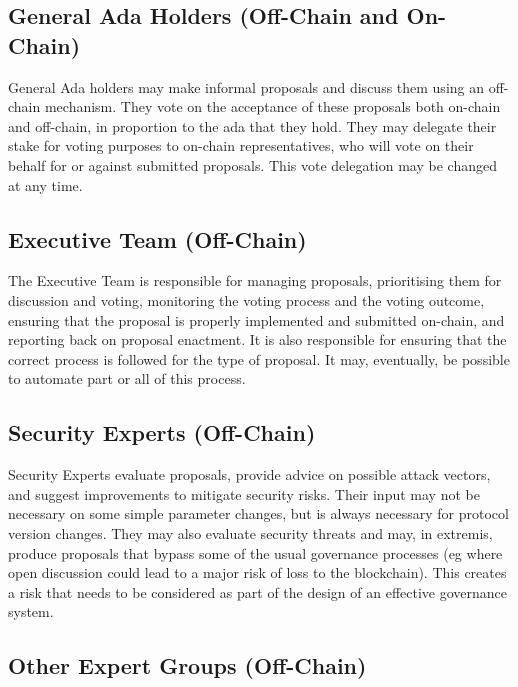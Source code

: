 \subsection{General Ada Holders (Off-Chain and On-Chain)}

General Ada holders may make informal proposals and discuss them using an off-chain mechanism.  They vote on the acceptance of these proposals
both on-chain and off-chain, in proportion to the ada that they hold.  They may delegate their stake for voting purposes to on-chain representatives,
who will vote on their behalf for or against submitted proposals.  This vote delegation may be changed at any time.

\subsection{Executive Team (Off-Chain)}

The Executive Team is responsible for managing proposals, prioritising them for discussion and voting, monitoring the voting process and the
voting outcome, ensuring that the proposal is properly implemented and submitted on-chain, and reporting back on proposal enactment.
It is also responsible for ensuring that the correct process is followed for the type of proposal.  It may, eventually, be possible to automate part or all of this process.

\subsection{Security Experts (Off-Chain)}

Security Experts evaluate proposals, provide advice on possible attack vectors, and suggest improvements to mitigate security risks.
Their input may not be necessary on some simple parameter changes, but is always necessary for protocol version changes.
They may also evaluate security threats and may, in extremis, produce proposals that bypass some of the usual governance processes
(eg where open discussion could lead to a major risk of loss to the blockchain).  This creates a risk that needs to be
considered as part of the design of an effective governance system.

\subsection{Other Expert Groups (Off-Chain)}

